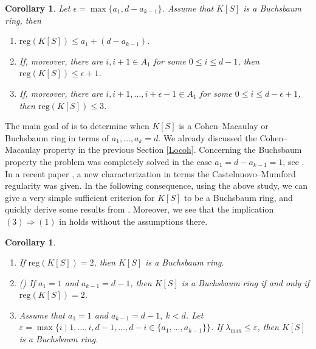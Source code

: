 \documentclass[11pt]{article}
\newtheorem{Corollary}[Theorem]{Corollary}
\def\reg{\mathrm{reg}}
\theoremstyle{remark}
\theoremstyle{definition}
\begin{document}
\begin{Corollary} \label{BbmReg1} Let $\epsilon = \max\{a_1, d-a_{k-1}\} $.  Assume that $K[S]$ is a  Buchsbaum ring, then 
\begin{enumerate}[\((i)\)]
    \item $\reg(K[S]) \leq a_1 + (d-a_{k-1}).$
    \item If,  moreover, there are $i, i+1 \in A_1$ for some $0\leq i \leq d-1$, then  $\reg(K[S]) \leq \epsilon +1$.
    \item If, moreover, there are $i, i+1,\ldots, i+\epsilon -1  \in A_1$ for some $0\leq i \leq d-\epsilon + 1$, then  $\reg(K[S]) \leq 3$.
\end{enumerate}
\end{Corollary}

The main goal of \cite{T} is to determine when $K[S]$ is a Cohen--Macaulay or Buchsbaum ring in terms of $a_1,\ldots,a_k=d$. We already discussed the Cohen--Macaulay property in the previous Section \ref{Locoh}. Concerning the Buchsbaum property the problem was completely solved  in the case $a_1 = d-a_{k-1} = 1$, see \cite[Theorem 4.1 and Theorem 4.3]{T}. In a recent paper \cite{LT}, a new characterization in terms the Castelnuovo--Mumford regularity was given. In the following consequence, using the above study, we can give a very simple sufficient criterion for $K[S]$  to be a Buchsbaum ring, and quickly derive some results from \cite{LT}. Moreover, we see that the implication $ (3) \Rightarrow (1)$ in \cite[Theorem 2.4 and Theorem 2.7]{LT} holds without the assumptions there. 

\begin{Corollary} \label{BbmReg2}
\begin{enumerate}[\((i)\)]
    \item If $\reg(K[S]) = 2$, then $K[S]$ is a Buchsbaum ring.
    \item (\cite[Theorem 2.3]{LT}) If $ a_1 =1$ and $ a_{k-1} = d-1$, then $K[S]$ is a  Buchsbaum ring if and only if $\reg(K[S]) = 2$.
    \item Assume that $a_1=1$ and $a_{k-1} = d-1, \ k<d$. Let $\varepsilon = \max\{i\mid 1,\ldots,i, d-1,\ldots,d-i \in \{a_1,\ldots,a_{k-1} \} \}$. If  $\lambda_{\max} \leq \varepsilon$, then $K[S]$ is a Buchsbaum ring.
\end{enumerate}
\end{Corollary}
\end{document}
